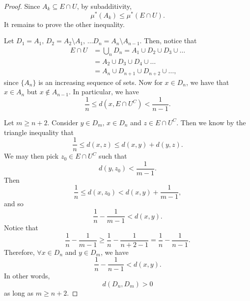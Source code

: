 \documentclass[notoc,notitlepage]{tufte-book}
\begin{document}
\begin{proof}
  \noindent
  Since $A_k \subseteq E \cap U$, by subadditivity,
  \begin{equation*}
    \mu^*(A_k) \leq \mu^*(E \cap U).
  \end{equation*}
  It remains to prove the other inequality.

  Let $D_1 = A_1,\, D_2 = A_2 \setminus A_1,\, \ldots D_n = A_n \setminus A_{n-1}$.
  Then, notice that
  \begin{align*}
    E \cap U &= \bigcup_{n} D_n = A_1 \cup D_2 \cup D_3 \cup \hdots \\
          &= A_2 \cup D_3 \cup D_4 \cup \hdots \\
          &= A_n \cup D_{n+1} \cup D_{n+2} \cup \hdots,
  \end{align*}
  since $\{ A_n \}$ is an increasing sequence of sets.
  Now for $x \in D_n$, we have that $x \in A_n$ but $x \notin A_{n-1}$.
  In particular, we have
  \begin{equation*}
    \frac{1}{n} \leq d(x, E \cap U^C) < \frac{1}{n-1}.
  \end{equation*}

  Let $m \geq n + 2$. Consider $y \in D_m,\, x \in D_n$ and $z \in E \cap U^C$.
  Then we know by the triangle inequality that
  \begin{equation*}
    \frac{1}{n} \leq d(x, z) \leq d(x, y) + d(y, z).
  \end{equation*}
  We may then pick $z_0 \in E \cap U^C$ such that
  \begin{equation*}
    d(y, z_0) < \frac{1}{m-1}.
  \end{equation*}
  Then
  \begin{equation*}
    \frac{1}{n} \leq d(x, z_0) < d(x, y) + \frac{1}{m-1},
  \end{equation*}
  and so
  \begin{equation*}
    \frac{1}{n} - \frac{1}{m-1} < d(x, y).
  \end{equation*}
  Notice that
  \begin{equation*}
    \frac{1}{n} - \frac{1}{m-1}
        \geq \frac{1}{n} - \frac{1}{n + 2 - 1}
        = \frac{1}{n} - \frac{1}{n-1}.
  \end{equation*}
  Therefore, $\forall x \in D_n$ and $y \in D_m$, we have
  \begin{equation*}
    \frac{1}{n} - \frac{1}{n-1} < d(x, y).
  \end{equation*}
  In other words,
  \begin{equation*}
    d(D_n, D_m) > 0
  \end{equation*}
  as long as $m \geq n + 2$.


\end{proof}
\end{document}
